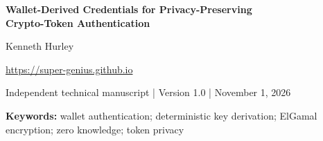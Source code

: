 \documentclass[10pt,letterpaper]{article}
\begin{document}
\begin{center}
{\Large\bfseries Wallet-Derived Credentials for Privacy-Preserving\\Crypto-Token Authentication\par}
\vspace{7pt}
{\normalsize Kenneth Hurley\par}
\vspace{2pt}
{\small \url{https://super-genius.github.io}\par}
\vspace{4pt}
{\footnotesize Independent technical manuscript \quad | \quad Version 1.0 \quad | \quad November 1, 2026}
\end{center}
\begin{abstract}
This paper presents a design for authenticating digital-token activity through an existing elliptic-curve wallet while deriving new credentials for private transactions. The architecture combines ECDSA wallet authentication, a key derivation function, ElGamal encryption, proxy addresses, and an optional zero-knowledge proof layer. We describe the intended relationships among account identity, derived credentials, encrypted signatures, and transaction validation. We also identify the security requirements that determine whether a derived credential is secret, recoverable, or linkable to its originating wallet. The paper is a system and protocol design, not a claim that the scheme has undergone formal verification or production security testing.
\end{abstract}
\vspace{3pt}
\noindent\textbf{Keywords:} wallet authentication; deterministic key derivation; ElGamal encryption; zero knowledge; token privacy
\vspace{15pt}
\end{document}
